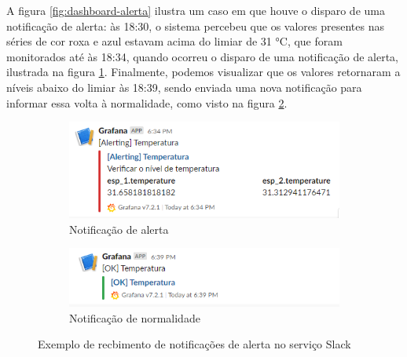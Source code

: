 \documentclass[../monografia.tex]{subfiles}
\begin{document}
A figura \ref{fig:dashboard-alerta} ilustra um caso em que houve o disparo de uma notificação de alerta: às 18:30, o sistema percebeu que os valores presentes nas séries de cor roxa e azul estavam acima do limiar de 31 °C, que foram monitorados até às 18:34, quando ocorreu o disparo de uma notificação de alerta, ilustrada na figura \ref{fig:slack-alerta}. Finalmente, podemos visualizar que os valores retornaram a níveis abaixo do limiar às 18:39, sendo enviada uma nova notificação para informar essa volta à normalidade, como visto na figura \ref{fig:slack-ok}.


\begin{figure}[h!]
	\centering
	\begin{subfigure}[b]{0.7\textwidth}
		\includegraphics[width=\textwidth]{grafana-slack-alert.png}
		\caption{Notificação de alerta}
		\label{fig:slack-alerta}
	\end{subfigure}
	
	\begin{subfigure}[b]{0.7\textwidth}
		\includegraphics[width=\textwidth]{grafana-slack-ok.png}
		\caption{Notificação de normalidade}
		\label{fig:slack-ok}
	\end{subfigure}

	\caption{Exemplo de recbimento de notificações de alerta no serviço Slack}
	\label{fig:slack-notifications}
\end{figure}
\end{document}
